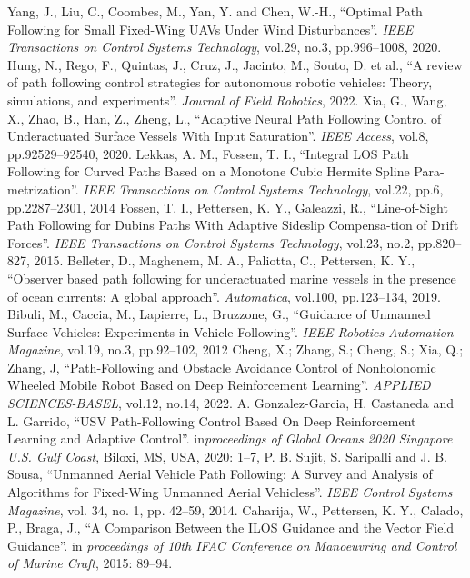 \documentclass[a4paper, 10pt, conference]{ieeeconf}      %
\begin{document}
\begin{thebibliography}{99}

 Yang, J., Liu, C., Coombes, M., Yan, Y. and Chen, W.-H., “Optimal Path Following for Small Fixed-Wing UAVs Under Wind Disturbances”. \emph{IEEE Transactions on Control Systems Technology}, vol.29, no.3, pp.996--1008, 2020.
 Hung, N., Rego, F., Quintas, J., Cruz, J., Jacinto, M., Souto, D. et al., “A review of path following control strategies for autonomous robotic vehicles: Theory, simulations, and experiments”. \emph{Journal of Field Robotics}, 2022. 
 Xia, G., Wang, X., Zhao, B., Han, Z., Zheng, L., “Adaptive Neural Path Following Control of Underactuated Surface Vessels With Input Saturation”. \emph{IEEE Access}, vol.8, pp.92529--92540, 2020.
 Lekkas, A. M., Fossen, T. I., “Integral LOS Path Following for Curved Paths Based on a Monotone Cubic Hermite Spline Para-metrization”. \emph{IEEE Transactions on Control Systems Technology}, vol.22, pp.6, pp.2287--2301, 2014
 Fossen, T. I., Pettersen, K. Y., Galeazzi, R., “Line-of-Sight Path Following for Dubins Paths With Adaptive Sideslip Compensa-tion of Drift Forces”. \emph{IEEE Transactions on Control Systems Technology}, vol.23, no.2, pp.820--827, 2015.
 Belleter, D., Maghenem, M. A., Paliotta, C., Pettersen, K. Y., “Observer based path following for underactuated marine vessels in the presence of ocean currents: A global approach”. \emph{Automatica}, vol.100, pp.123--134, 2019.
 Bibuli, M., Caccia, M., Lapierre, L., Bruzzone, G., “Guidance of Unmanned Surface Vehicles: Experiments in Vehicle Following”. \emph{IEEE Robotics Automation Magazine}, vol.19, no.3, pp.92--102, 2012 
 Cheng, X.; Zhang, S.; Cheng, S.; Xia, Q.; Zhang, J, “Path-Following and Obstacle Avoidance Control of Nonholonomic Wheeled Mobile Robot Based on Deep Reinforcement Learning”. \emph{APPLIED SCIENCES-BASEL}, vol.12, no.14, 2022.
 A. Gonzalez-Garcia, H. Castaneda and L. Garrido, “USV Path-Following Control Based On Deep Reinforcement Learning and Adaptive Control”. in\emph{proceedings of Global Oceans 2020 Singapore U.S. Gulf Coast}, Biloxi, MS, USA, 2020: 1--7, 
 P. B. Sujit, S. Saripalli and J. B. Sousa, “Unmanned Aerial Vehicle Path Following: A Survey and Analysis of Algorithms for Fixed-Wing Unmanned Aerial Vehicless”. \emph{IEEE Control Systems Magazine}, vol. 34, no. 1, pp. 42--59, 2014.
 Caharija, W., Pettersen, K. Y., Calado, P., Braga, J., “A Comparison Between the ILOS Guidance and the Vector Field Guidance”. in \emph{proceedings of 10th IFAC Conference on Manoeuvring and Control of Marine Craft}, 2015: 89--94.

\end{thebibliography}
\end{document}
